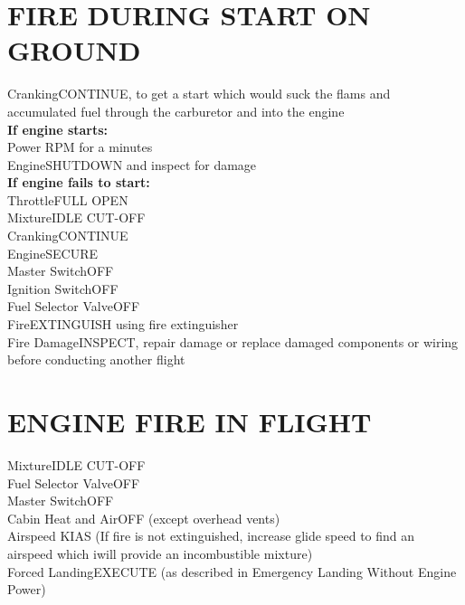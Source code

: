 \documentclass{article}
\begin{document}
\begin{multicols*}{2}
\section*{FIRE DURING START ON GROUND}
Cranking\dotfill CONTINUE, to get a start which would suck the flams and accumulated fuel through the carburetor and into the engine\\
\textbf{If engine starts:}\\
Power RPM for a minutes\\
Engine\dotfill SHUTDOWN and inspect for damage\\
\textbf{If engine fails to start:}\\
Throttle\dotfill FULL OPEN\\
Mixture\dotfill IDLE CUT-OFF\\
Cranking\dotfill CONTINUE\\
Engine\dotfill SECURE\\
\hspace*{6mm}Master Switch\dotfill OFF\\
\hspace*{6mm}Ignition Switch\dotfill OFF\\
\hspace*{6mm}Fuel Selector Valve\dotfill OFF\\
Fire\dotfill EXTINGUISH using fire extinguisher\\
Fire Damage\dotfill INSPECT, repair damage or replace damaged components or wiring before conducting another flight
\vfill\null
\section*{ENGINE FIRE IN FLIGHT}
Mixture\dotfill IDLE CUT-OFF\\
Fuel Selector Valve\dotfill OFF\\
Master Switch\dotfill OFF\\
Cabin Heat and Air\dotfill OFF (except overhead vents)\\
Airspeed KIAS (If fire is not extinguished, increase glide speed to find an airspeed which iwill provide an incombustible mixture)\\
Forced Landing\dotfill EXECUTE (as described in Emergency Landing Without Engine Power)

\end{multicols*}
\end{document}
